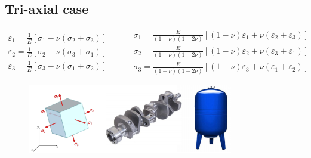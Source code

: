 \documentclass[class=report, crop=false, 12pt,a4paper]{standalone}
\begin{document}
\subsection{Tri-axial case}
\begin{equation}
    \begin{array}{l}
        \varepsilon_1 = \frac{1}{E}\left[\sigma_1-\nu\left(\sigma_2 + \sigma_3\right)\right]\\
        \varepsilon_2 = \frac{1}{E}\left[\sigma_2-\nu\left(\sigma_3 + \sigma_1\right)\right]\\
        \varepsilon_3 = \frac{1}{E}\left[\sigma_3-\nu\left(\sigma_1 + \sigma_2\right)\right]    
    \end{array} \hspace{1cm} \begin{array}{l}
        \sigma_1 = \frac{E}{\left(1+\nu\right)\left(1-2\nu\right)}\left[\left(1-\nu\right)\varepsilon_1 + \nu \left(\varepsilon_2 + \varepsilon_3\right)\right]\\
        \sigma_2 = \frac{E}{\left(1+\nu\right)\left(1-2\nu\right)}\left[\left(1-\nu\right)\varepsilon_2 + \nu \left(\varepsilon_3 + \varepsilon_1\right)\right]\\
        \sigma_3 = \frac{E}{\left(1+\nu\right)\left(1-2\nu\right)}\left[\left(1-\nu\right)\varepsilon_3 + \nu \left(\varepsilon_1 + \varepsilon_2\right)\right]
    \end{array}
\end{equation}
\begin{figure}[H]
    \centering
    \includegraphics[width = 0.8\textwidth]{../img/diagram70.png}
    \caption{}
\end{figure}
\end{document}

